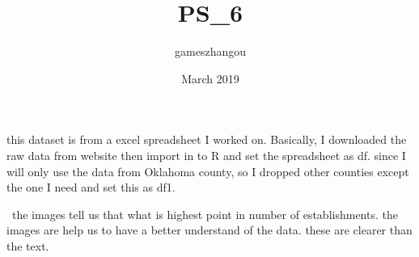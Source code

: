 \documentclass{article}
\title{PS_6}
\author{gameszhangou }
\date{March 2019}
\begin{document}
this dataset is from a excel spreadsheet I worked on. Basically, I downloaded the raw data from website then import in to R and set the spreadsheet as df. since I will only use the data from Oklahoma county, so I dropped other counties except the one I need and set this as df1. 

\
the images tell us that what is highest point in number of establishments.
the images are help us to have a better understand of the data. these are clearer than the text.


\


\
  
\end{document}
